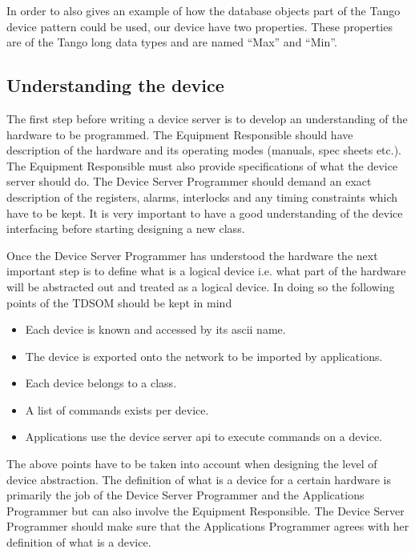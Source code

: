 In order to also gives an example of how the database objects part
of the Tango device pattern could be used, our device have two properties.
These properties are of the Tango long data types and are named ``Max''
and ``Min''.


\subsection{Understanding the device}

The first step before writing a device server is to develop an understanding
of the hardware to be programmed. The Equipment Responsible should
have description of the hardware and its operating modes (manuals,
spec sheets etc.). The Equipment Responsible must also provide specifications
of what the device server should do. The Device Server Programmer
should demand an exact description of the registers, alarms, interlocks
and any timing constraints which have to be kept. It is very important
to have a good understanding of the device interfacing before starting
designing a new class. 

Once the Device Server Programmer has understood the hardware the
next important step is to define what is a logical device i.e. what
part of the hardware will be abstracted out and treated as a logical
device. In doing so the following points of the TDSOM should be kept
in mind 
\begin{itemize}
\item Each device is known and accessed by its ascii name.
\item The device is exported onto the network to be imported by applications.
\item Each device belongs to a class.
\item A list of commands exists per device.
\item Applications use the device server api to execute commands on a device. 
\end{itemize}
The above points have to be taken into account when designing the
level of device abstraction. The definition of what is a device for
a certain hardware is primarily the job of the Device Server Programmer
and the Applications Programmer but can also involve the Equipment
Responsible. The Device Server Programmer should make sure that the
Applications Programmer agrees with her definition of what is a device.

